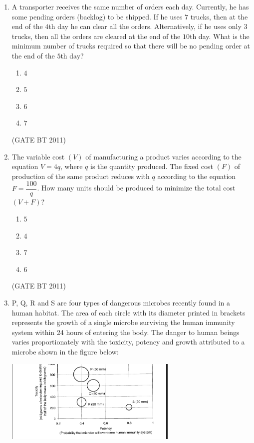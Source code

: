 \documentclass[journal,12pt,onecolumn]{IEEEtran}
\begin{document}
\begin{enumerate}
\item A transporter receives the same number of orders each day. 
Currently, he has some pending orders (backlog) to be shipped. 
If he uses $7$ trucks, then at the end of the $4$th day he can clear all the orders. 
Alternatively, if he uses only $3$ trucks, then all the orders are cleared at the end of the $10$th day. 
What is the minimum number of trucks required so that there will be no pending order at the end of the $5$th day?

\begin{multicols}{4}
  \begin{enumerate}
    \item $4$
    \item $5$
    \item $6$
    \item $7$
  \end{enumerate}
\end{multicols} \hfill(GATE BT 2011)

\item The variable cost $(V)$ of manufacturing a product varies according to the equation 
$V = 4q$, where $q$ is the quantity produced. 
The fixed cost $(F)$ of production of the same product reduces with $q$ according to the equation 
$F = \dfrac{100}{q}$. 
How many units should be produced to minimize the total cost $(V + F)$?

\begin{multicols}{4}
  \begin{enumerate}
    \item $5$
    \item $4$
    \item $7$
    \item $6$
  \end{enumerate}
\end{multicols} \hfill(GATE BT 2011)

\item P, Q, R and S are four types of dangerous microbes recently found in a human habitat. 
The area of each circle with its diameter printed in brackets represents the growth of a single microbe surviving the human immunity system within 24 hours of entering the body. 
The danger to human beings varies proportionately with the toxicity, potency and growth attributed to a microbe shown in the figure below:

\begin{center}
\includegraphics[width=0.65\textwidth]{fig 1.png}
\end{center}


\end{enumerate}
\end{document}
